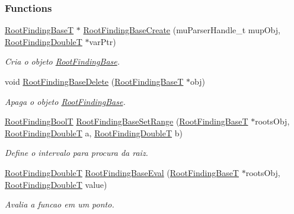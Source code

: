 \subsubsection*{Functions}
\begin{CompactItemize}
\item 
\hyperlink{structRootFindingBase}{RootFindingBaseT} $\ast$ \hyperlink{group____roots_gb245c32498c083793bc740a45b118280}{RootFindingBaseCreate} (muParserHandle\_\-t mupObj, \hyperlink{RootFindingCommon_8h_a296fe63994e03408c4ad62794d472e9}{RootFindingDoubleT} $\ast$varPtr)
\begin{CompactList}\small\item\em Cria o objeto \hyperlink{structRootFindingBase}{RootFindingBase}. \item\end{CompactList}\item 
void \hyperlink{group____roots_gaf5d5b67be8d281fefa22e9e7cb4c24b}{RootFindingBaseDelete} (\hyperlink{structRootFindingBase}{RootFindingBaseT} $\ast$obj)
\begin{CompactList}\small\item\em Apaga o objeto \hyperlink{structRootFindingBase}{RootFindingBase}. \item\end{CompactList}\item 
\hyperlink{RootFindingCommon_8h_31228d356f5429fa5ba7f206e4dee12f}{RootFindingBoolT} \hyperlink{group____roots_g66563d156c9a25a8316a9c557e0bf7b8}{RootFindingBaseSetRange} (\hyperlink{structRootFindingBase}{RootFindingBaseT} $\ast$rootsObj, \hyperlink{RootFindingCommon_8h_a296fe63994e03408c4ad62794d472e9}{RootFindingDoubleT} a, \hyperlink{RootFindingCommon_8h_a296fe63994e03408c4ad62794d472e9}{RootFindingDoubleT} b)
\begin{CompactList}\small\item\em Define o intervalo para procura da raiz. \item\end{CompactList}\item 
\hyperlink{RootFindingCommon_8h_a296fe63994e03408c4ad62794d472e9}{RootFindingDoubleT} \hyperlink{group____roots_g5d64bcdb5cde64f2e5c757f74e82d336}{RootFindingBaseEval} (\hyperlink{structRootFindingBase}{RootFindingBaseT} $\ast$rootsObj, \hyperlink{RootFindingCommon_8h_a296fe63994e03408c4ad62794d472e9}{RootFindingDoubleT} value)
\begin{CompactList}\small\item\em Avalia a funcao em um ponto. \item\end{CompactList}\item 

\end{CompactItemize}
